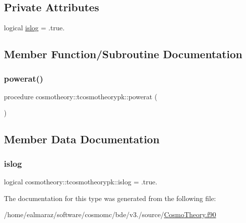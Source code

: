 \subsection*{Private Attributes}
\begin{DoxyCompactItemize}
\item 
logical \mbox{\hyperlink{structcosmotheory_1_1tcosmotheorypk_abd98cf9f0b75d3f4cfef0b9b9ca1b8bb}{islog}} = .true.
\end{DoxyCompactItemize}


\subsection{Member Function/\+Subroutine Documentation}
\mbox{\label{structcosmotheory_1_1tcosmotheorypk_a372960b05a2088335f35fd11b5189b81}} 
\subsubsection{\texorpdfstring{powerat()}{powerat()}}
{\footnotesize\ttfamily procedure cosmotheory\+::tcosmotheorypk\+::powerat (\begin{DoxyParamCaption}{ }\end{DoxyParamCaption})\hspace{0.3cm}{\ttfamily [private]}}



\subsection{Member Data Documentation}
\mbox{\label{structcosmotheory_1_1tcosmotheorypk_abd98cf9f0b75d3f4cfef0b9b9ca1b8bb}} 
\subsubsection{\texorpdfstring{islog}{islog}}
{\footnotesize\ttfamily logical cosmotheory\+::tcosmotheorypk\+::islog = .true.\hspace{0.3cm}{\ttfamily [private]}}



The documentation for this type was generated from the following file\+:\begin{DoxyCompactItemize}
\item 
/home/ealmaraz/software/cosmomc/bde/v3./source/\mbox{\hyperlink{CosmoTheory_8f90}{Cosmo\+Theory.\+f90}}\end{DoxyCompactItemize}
